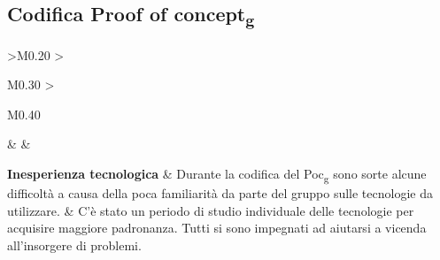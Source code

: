 \subsection{Codifica Proof of concept\textsubscript{g}}
\begin{longtable}{ 
	>{\centering}M{0.20\textwidth} 
	>{\raggedright}M{0.30\textwidth}
	>{\raggedright}M{0.40\textwidth}
	}
	\rowcolorhead
	\centering 
	 &	
	 &
	\endfirsthead	
	\endhead
	
	\textbf{Inesperienza tecnologica} & 
    Durante la codifica del Poc\textsubscript{g} sono sorte alcune difficoltà a causa della poca
    familiarità da parte del gruppo sulle tecnologie da utilizzare. & 
    C'è stato un periodo di studio individuale delle tecnologie per acquisire maggiore padronanza. 
    Tutti si sono impegnati ad aiutarsi a vicenda all'insorgere di problemi. \tabularnewline
	\captionline \caption{Attualizzazione dei rischi nel periodo di Codifica Proof of concept\textsubscript{g}}
\end{longtable}